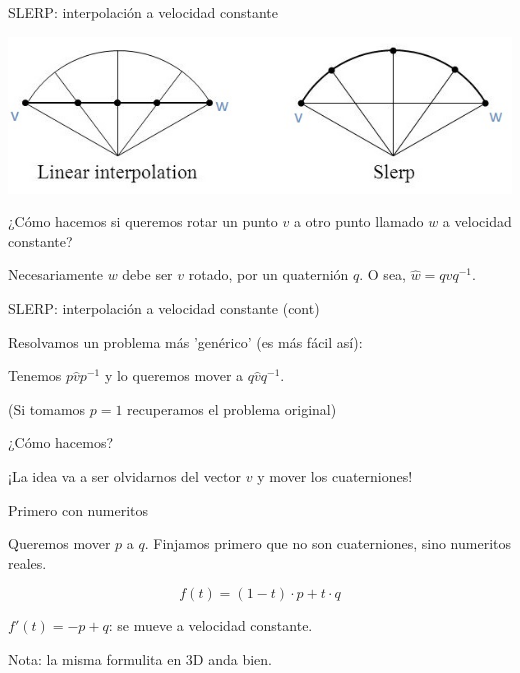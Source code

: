 \documentclass[10pt]{beamer}
\def\m{^{-1}}
\begin{document}
\fi


\begin{frame}{SLERP: interpolación a velocidad constante}

\includegraphics[scale=0.66]{Slerp2.jpg} \bigskip

¿Cómo hacemos si queremos rotar un punto $v$ a otro punto llamado $w$ a velocidad constante? \pause

Necesariamente $w$ debe ser $v$ rotado, por un quaternión $q$. O sea, $\hat{w}=q\hat{v}q\m$. \pause

\end{frame}

\begin{frame}{SLERP: interpolación a velocidad constante (cont)}

Resolvamos un problema más 'genérico' (es más fácil así):

Tenemos $p\hat{v}p\m$ y lo queremos mover a $q\hat{v}q\m$.

(Si tomamos $p=1$ recuperamos el problema original) \pause

¿Cómo hacemos? \pause

¡La idea va a ser olvidarnos del vector $v$ y mover los cuaterniones!

\end{frame}

\begin{frame}{Primero con numeritos}

Queremos mover $p$ a $q$. Finjamos primero que no son cuaterniones, sino numeritos reales. \pause




$$f(t) = (1-t) \cdot p + t\cdot q$$

$f'(t) = - p + q$: se mueve a velocidad constante. \pause \bigskip


Nota: la misma formulita en 3D anda bien.


\end{frame}
\end{document}
